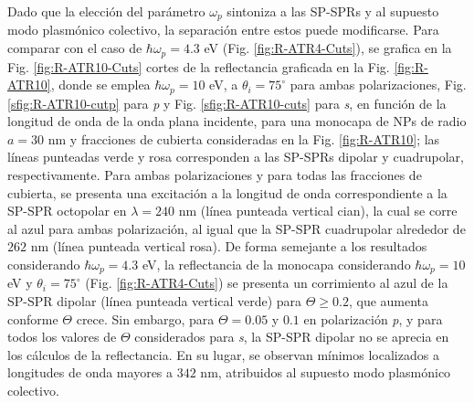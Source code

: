 Dado que la elección del parámetro $\omega_p$ sintoniza a las SP-SPRs y al supuesto modo plasmónico colectivo, la separación entre estos puede modificarse. Para comparar con el caso de $\hbar\omega_p=4.3$ eV (Fig. \ref{fig:R-ATR4-Cuts}), se grafica en la Fig. \ref{fig:R-ATR10-Cuts} cortes de la reflectancia graficada en la Fig. \ref{fig:R-ATR10}, donde se emplea $\hbar\omega_p = 10$ eV, a $\theta_i = 75^\circ$ para ambas polarizaciones,  Fig. \ref{sfig:R-ATR10-cutp} para \emph{p} y Fig. \ref{sfig:R-ATR10-cuts} para \emph{s}, en  función de la longitud de onda de la onda plana incidente, para una monocapa de NPs de radio $a= 30$ nm  y fracciones de cubierta consideradas en la Fig. \ref{fig:R-ATR10}; las líneas punteadas verde y rosa  corresponden a las SP-SPRs dipolar y cuadrupolar, respectivamente. Para ambas polarizaciones y para todas las fracciones de cubierta, se presenta una excitación a la longitud de onda correspondiente a la SP-SPR octopolar en $\lambda=240$ nm (línea punteada vertical cian), la cual se corre al azul para ambas polarización, al igual que  la SP-SPR cuadrupolar alrededor de $262$ nm (línea punteada vertical rosa). De forma semejante a los resultados considerando $\hbar\omega_p = 4.3$ eV, la reflectancia de la monocapa considerando $\hbar\omega_p=10$ eV y $\theta_i=75^\circ$ (Fig. \ref{fig:R-ATR4-Cuts}) se presenta un corrimiento al azul de la SP-SPR dipolar (línea punteada vertical verde) para $\Theta\geq 0.2$, que aumenta conforme $\Theta$ crece. Sin embargo, para $\Theta=0.05$ y $0.1$ en polarización \emph{p}, y para todos los valores de $\Theta$ considerados para \emph{s}, la SP-SPR dipolar no se aprecia en los cálculos de la reflectancia. En su lugar, se observan mínimos  localizados a longitudes de onda mayores a $342$ nm, atribuidos al supuesto modo plasmónico colectivo.

